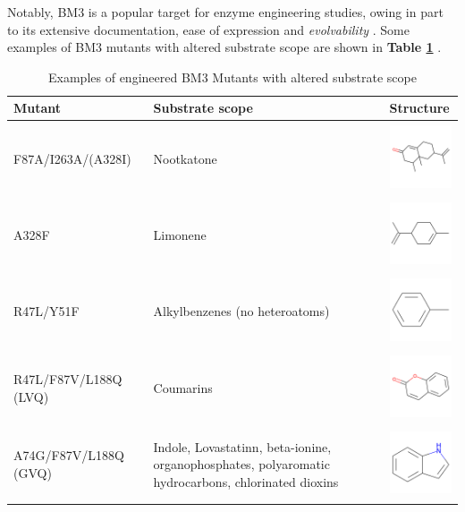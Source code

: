 \documentclass[16pt]{book}
\begin{document}
Notably, BM3 is a popular target for enzyme engineering studies, owing in part to its extensive documentation, ease of expression and \textit{evolvability} \cite{bloom2006protein}.
Some examples of BM3 mutants with altered substrate scope are shown in \textbf{Table \ref{bm3_table}} \cite{wong}.
\par

\begin{table}
	\begin{center}
		\caption{\label{bm3_table}Examples of engineered BM3 Mutants with altered substrate scope \cite{wong}}
		\begin{tabular}{l|p{3cm}|l}
		\textbf{Mutant} & \textbf{Substrate scope} & \textbf{Structure} \\
		\hline 
		F87A/I263A/(A328I) & Nootkatone & \includegraphics[width = 2cm, height= 2cm, keepaspectratio=true]{img/nookatone.png} \\
		A328F & Limonene & \includegraphics[width=2cm, height= 2cm, keepaspectratio=true]{img/limonene.png} \\
		R47L/Y51F & Alkylbenzenes (no heteroatoms) & \includegraphics[width=2cm, height= 2cm, keepaspectratio=true]{img/alkyl-benzene.png} \\
			R47L/F87V/L188Q (LVQ) & Coumarins & \includegraphics[width=2cm, height= 2cm, keepaspectratio=true]{img/coumarin.png} \\ %
			A74G/F87V/L188Q (GVQ) & Indole, Lovastatinn, beta-ionine, organophosphates, polyaromatic hydrocarbons, chlorinated dioxins & \includegraphics[width=2cm, height= 2cm, keepaspectratio=true]{img/indole.png} \\
	\end{tabular}
	\end{center}
\end{table}
\end{document}
